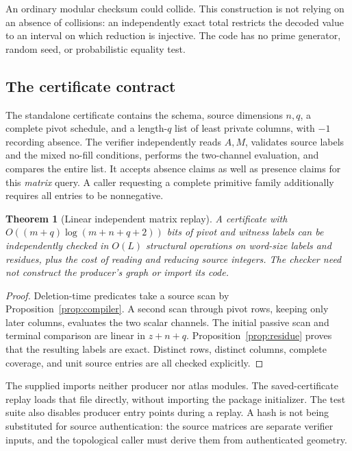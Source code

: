 \documentclass[11pt,letterpaper]{article}
\newtheorem{theorem}{Theorem}[section]
\theoremstyle{definition}
\begin{document}
An ordinary modular checksum could collide. This construction is not relying on an absence of collisions: an independently exact total restricts the decoded value to an interval on which reduction is injective. The code has no prime generator, random seed, or probabilistic equality test.

\subsection{The certificate contract}
The standalone certificate contains the schema, source dimensions $n,q$, a complete pivot schedule, and a length-$q$ list of least private columns, with $-1$ recording absence. The verifier independently reads $A,M$, validates source labels and the mixed no-fill conditions, performs the two-channel evaluation, and compares the entire list. It accepts absence claims as well as presence claims for this \emph{matrix} query. A caller requesting a complete primitive family additionally requires all entries to be nonnegative.

\begin{theorem}[Linear independent matrix replay]\label{thm:verify}
A certificate with $O((m+q)\log(m+n+q+2))$ bits of pivot and witness labels can be independently checked in $O(L)$ structural operations on word-size labels and residues, plus the cost of reading and reducing source integers. The checker need not construct the producer's graph or import its code.
\end{theorem}
\begin{proof}
Deletion-time predicates take a source scan by Proposition~\ref{prop:compiler}. A second scan through pivot rows, keeping only later columns, evaluates the two scalar channels. The initial passive scan and terminal comparison are linear in $z+n+q$. Proposition~\ref{prop:residue} proves that the resulting labels are exact. Distinct rows, distinct columns, complete coverage, and unit source entries are all checked explicitly.
\end{proof}

The supplied  imports neither producer nor atlas modules. The saved-certificate replay loads that file directly, without importing the package initializer. The test suite also disables producer entry points during a replay. A hash is not being substituted for source authentication: the source matrices are separate verifier inputs, and the topological caller must derive them from authenticated geometry.
\end{document}
